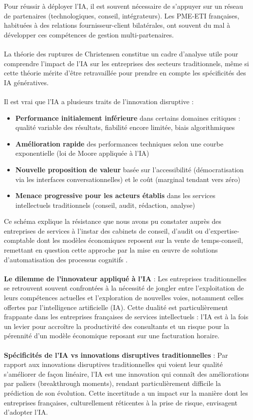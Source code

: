 Pour réussir à déployer l’IA, il est souvent nécessaire de s’appuyer sur un réseau de partenaires (technologiques, conseil, intégrateurs). Les PME-ETI françaises, habituées à des relations fournisseur-client bilatérales, ont souvent du mal à développer ces compétences de gestion multi-partenaires.
\\\\
La théorie des ruptures de Christensen constitue un cadre d’analyse utile pour comprendre l’impact de l’IA sur les entreprises des secteurs traditionnels, même si cette théorie mérite d’être retravaillée pour prendre en compte les spécificités des IA génératives.
\\\\
Il est vrai que l’IA a plusieurs traits de l’innovation disruptive :
\begin{itemize}
    \item \textbf{Performance initialement inférieure} dans certains domaines critiques : qualité variable des résultats, fiabilité encore limitée, biais algorithmiques
    \item \textbf{Amélioration rapide} des performances techniques selon une courbe exponentielle (loi de Moore appliquée à l'IA)
    \item \textbf{Nouvelle proposition de valeur} basée sur l'accessibilité (démocratisation via les interfaces conversationnelles) et le coût (marginal tendant vers zéro)
    \item \textbf{Menace progressive pour les acteurs établis} dans les services intellectuels traditionnels (conseil, audit, rédaction, analyse)
\end{itemize}
\medskip
Ce schéma explique la résistance que nous avons pu constater auprès des entreprises de services à l’instar des cabinets de conseil, d’audit ou d’expertise-comptable dont les modèles économiques reposent sur la vente de temps-conseil, remettant en question cette approche par la mise en œuvre de solutions d’automatisation des processus cognitifs \cite{syntec2024ai}.
\\\\
\textbf{Le dilemme de l'innovateur appliqué à l'IA} : Les entreprises traditionnelles se retrouvent souvent confrontées à la nécessité de jongler entre l’exploitation de leurs compétences actuelles et l’exploration de nouvelles voies, notamment celles offertes par l’intelligence artificielle (IA). Cette dualité est particulièrement frappante dans les entreprises françaises de services intellectuels : l’IA est à la fois un levier pour accroître la productivité des consultants et un risque pour la pérennité d’un modèle économique reposant sur une facturation horaire.
\\\\
\textbf{Spécificités de l'IA vs innovations disruptives traditionnelles} : Par rapport aux innovations disruptives traditionnelles qui voient leur qualité s'améliorer de façon linéaire, l'IA est une innovation qui connaît des améliorations par paliers (breakthrough moments), rendant particulièrement difficile la prédiction de son évolution. Cette incertitude a un impact sur la manière dont les entreprises françaises, culturellement réticentes à la prise de risque, envisagent d'adopter l'IA.

